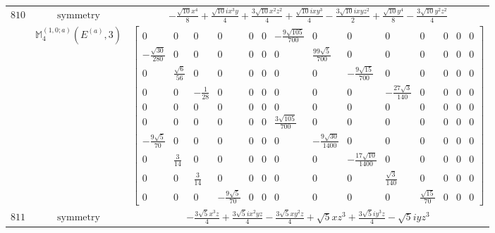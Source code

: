 \documentclass[fleqn,8pt,landscape]{jsarticle}
\begin{document}
\begin{longtable}{ccc}
$ 810 $ & $ \text{symmetry} $ & $ - \frac{\sqrt{10} x^{4}}{8} + \frac{\sqrt{10} i x^{3} y}{4} + \frac{3 \sqrt{10} x^{2} z^{2}}{4} + \frac{\sqrt{10} i x y^{3}}{4} - \frac{3 \sqrt{10} i x y z^{2}}{2} + \frac{\sqrt{10} y^{4}}{8} - \frac{3 \sqrt{10} y^{2} z^{2}}{4} $ \\
$  $ & $ \mathbb{M}_{4}^{(1,0;a)}(E^{(a)},3) $ & $ \begin{bmatrix} 0 & 0 & 0 & 0 & 0 & 0 & - \frac{9 \sqrt{105}}{700} & 0 & 0 & 0 & 0 & 0 & 0 & 0 \\ - \frac{\sqrt{30}}{280} & 0 & 0 & 0 & 0 & 0 & 0 & \frac{99 \sqrt{5}}{700} & 0 & 0 & 0 & 0 & 0 & 0 \\ 0 & \frac{\sqrt{6}}{56} & 0 & 0 & 0 & 0 & 0 & 0 & - \frac{9 \sqrt{15}}{700} & 0 & 0 & 0 & 0 & 0 \\ 0 & 0 & - \frac{1}{28} & 0 & 0 & 0 & 0 & 0 & 0 & - \frac{27 \sqrt{3}}{140} & 0 & 0 & 0 & 0 \\ 0 & 0 & 0 & 0 & 0 & 0 & 0 & 0 & 0 & 0 & 0 & 0 & 0 & 0 \\ 0 & 0 & 0 & 0 & 0 & 0 & \frac{3 \sqrt{105}}{700} & 0 & 0 & 0 & 0 & 0 & 0 & 0 \\ - \frac{9 \sqrt{5}}{70} & 0 & 0 & 0 & 0 & 0 & 0 & - \frac{9 \sqrt{30}}{1400} & 0 & 0 & 0 & 0 & 0 & 0 \\ 0 & \frac{3}{14} & 0 & 0 & 0 & 0 & 0 & 0 & - \frac{17 \sqrt{10}}{1400} & 0 & 0 & 0 & 0 & 0 \\ 0 & 0 & \frac{3}{14} & 0 & 0 & 0 & 0 & 0 & 0 & \frac{\sqrt{3}}{140} & 0 & 0 & 0 & 0 \\ 0 & 0 & 0 & - \frac{9 \sqrt{5}}{70} & 0 & 0 & 0 & 0 & 0 & 0 & \frac{\sqrt{15}}{70} & 0 & 0 & 0 \end{bmatrix} $ \\ \hline
$ 811 $ & $ \text{symmetry} $ & $ - \frac{3 \sqrt{5} x^{3} z}{4} + \frac{3 \sqrt{5} i x^{2} y z}{4} - \frac{3 \sqrt{5} x y^{2} z}{4} + \sqrt{5} x z^{3} + \frac{3 \sqrt{5} i y^{3} z}{4} - \sqrt{5} i y z^{3} $ \\

\end{longtable}
\end{document}
